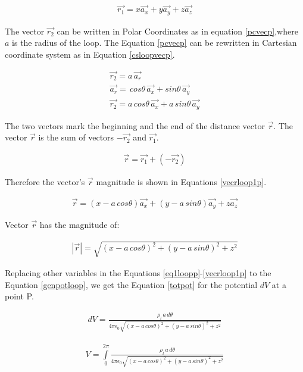 \documentclass{ximera}
\begin{document}
\begin{eqnarray}
\vec{r_1}=x \vec{a_x} + y \vec{a_y} +z\vec{a_z} \label{eq1loopp}
\end{eqnarray}

The vector $\vec{r_2}$ can be written in Polar Coordinates as in equation \ref{pcvecp},where $a$ is the radius of the loop. The Equation \ref{pcvecp} can be rewritten in Cartesian coordinate system as in Equation \ref{csloopvecp}.

\begin{eqnarray}
\vec{r_2}=a \, \vec{a_r} \label{pcvecp} \\
\vec{a_r}= \,cos{\theta} \, \vec{a_x}+ sin{\theta} \, \vec{a_y} \\
\vec{r_2}=a \, cos{\theta}\,  \vec{a_x}+ a \, sin{\theta} \, \vec{a_y} \label{csloopvecp}
\end{eqnarray}

The two vectors mark the beginning and the end of the distance vector $\vec{r}$. The vector  $\vec{r}$ is the sum of vectors $-\vec{r_2}$ and $\vec{r_1}$. 



\begin{eqnarray}
\vec{r}=\vec{r_1} + (-\vec{r_2})
\end{eqnarray}


Therefore the vector's $\vec{r}$  magnitude is shown in Equations \ref{vecrloop1p}.


\begin{eqnarray}
\vec{r}= (x -  a \,cos{\theta}) \vec{a_x} +(y - a \,sin{\theta}) \vec{a_y} +z \vec{a_z}
\end{eqnarray}

Vector $\vec{r}$ has the magnitude of:


\begin{eqnarray}
|\vec{r}|= \sqrt{(x - a \,cos{\theta})^2 +(y - a \,sin{\theta})^2 +z ^2}\label{vecrloop1p}
\end{eqnarray}

Replacing other variables in the Equations \ref{eq1loopp}-\ref{vecrloop1p} to the Equation \ref{genpotloop}, we get the    Equation \ref{totpot} for the potential $dV$ at a point P.

\begin{eqnarray}
dV= \frac{\rho_l \, a \, d\theta }{4 \pi \epsilon_{0} {  \sqrt{(x - a \,cos{\theta})^2 +(y - a \,sin{\theta})^2 +z ^2}  }}\label{totpot}
\end{eqnarray}



\begin{eqnarray}
V= \int\limits_0^{2 \pi}\frac{\rho_l \, a \, d\theta }{4 \pi \epsilon_{0} {  \sqrt{(x - a \,cos{\theta})^2 +(y - a \,sin{\theta})^2 +z ^2}  }}\label{totalfieldloopp2}
\end{eqnarray}
\end{document}
